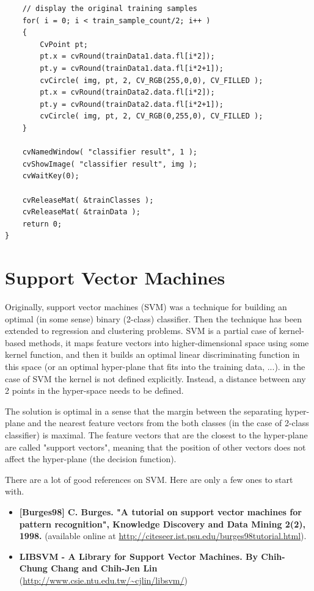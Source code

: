 \begin{lstlisting}
    // display the original training samples
    for( i = 0; i < train_sample_count/2; i++ )
    {
        CvPoint pt;
        pt.x = cvRound(trainData1.data.fl[i*2]);
        pt.y = cvRound(trainData1.data.fl[i*2+1]);
        cvCircle( img, pt, 2, CV_RGB(255,0,0), CV_FILLED );
        pt.x = cvRound(trainData2.data.fl[i*2]);
        pt.y = cvRound(trainData2.data.fl[i*2+1]);
        cvCircle( img, pt, 2, CV_RGB(0,255,0), CV_FILLED );
    }

    cvNamedWindow( "classifier result", 1 );
    cvShowImage( "classifier result", img );
    cvWaitKey(0);

    cvReleaseMat( &trainClasses );
    cvReleaseMat( &trainData );
    return 0;
}
\end{lstlisting}


\section{Support Vector Machines}

Originally, support vector machines (SVM) was a technique for building an optimal (in some sense) binary (2-class) classifier. Then the technique has been extended to regression and clustering problems. SVM is a partial case of kernel-based methods, it maps feature vectors into higher-dimensional space using some kernel function, and then it builds an optimal linear discriminating function in this space (or an optimal hyper-plane that fits into the training data, ...). in the case of SVM the kernel is not defined explicitly. Instead, a distance between any 2 points in the hyper-space needs to be defined.

The solution is optimal in a sense that the margin between the separating hyper-plane and the nearest feature vectors from the both classes (in the case of 2-class classifier) is maximal. The feature vectors that are the closest to the hyper-plane are called "support vectors", meaning that the position of other vectors does not affect the hyper-plane (the decision function).

There are a lot of good references on SVM. Here are only a few ones to start with.
\begin{itemize}
\item \textbf{[Burges98] C. Burges. "A tutorial on support vector machines for pattern recognition", Knowledge Discovery and Data Mining 2(2), 1998.} (available online at \url{http://citeseer.ist.psu.edu/burges98tutorial.html}).
\item \textbf{LIBSVM - A Library for Support Vector Machines. By Chih-Chung Chang and Chih-Jen Lin} (\url{http://www.csie.ntu.edu.tw/~cjlin/libsvm/})
\end{itemize}


